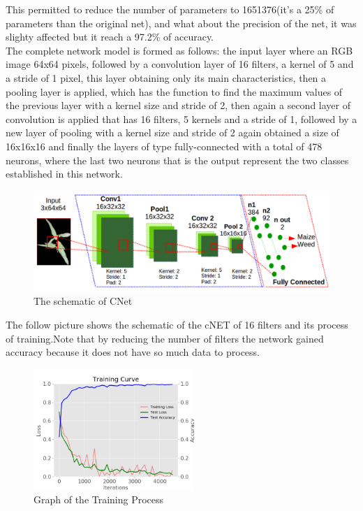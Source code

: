 \documentclass[conference]{IEEEtran}
\begin{document}
This permitted to reduce the number of parameters to 1651376(it's a 25\% of parameters than the original net), and what about the precision of the net, it was slighty affected but it reach a 97.2\% of accuracy.\\

The complete network model is formed as follows: the input layer where an RGB image 64x64 pixels, followed by a convolution layer of 16 filters, a kernel of 5 and a stride of 1 pixel, this layer  obtaining only its main characteristics, then a pooling layer is applied, which has the function to find the maximum values of the previous layer with a kernel size and stride of 2, then again a second layer of convolution is applied that has 16 filters, 5 kernels and a stride of 1, followed by a new layer of pooling with a kernel size and stride of 2 again obtained a size of 16x16x16 and finally the layers of type fully-connected with a total of 478 neurons, where the last two neurons that is the output represent the two classes established in this network.\\
	
	\begin{figure}[h]
	\centering
	\includegraphics[width=3.5 in]{arquitectura}
	\caption{ The schematic of CNet }
	\label{fig_sim}
	\end{figure}
	

	
The follow picture shows the schematic of the cNET of 16 filters and its process of training.Note that by reducing the number of filters the network gained accuracy because it does not have so much data to process.\\

	\begin{figure}[h]
	\centering
	\includegraphics[width=2.4in]{entrenamiento}
	\caption{ Graph of the Training Process }
	\label{fig_sim}
	\end{figure}
	
\end{document}
